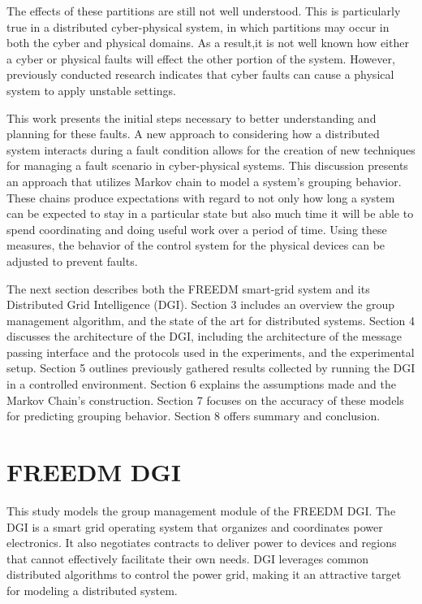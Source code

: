 The effects of these partitions are still not well understood.
This is particularly true in a distributed cyber-physical system, in which partitions may occur in both the cyber and physical domains.
As a result,it is not well known how either a cyber or physical faults will effect the other portion of the system.
However, previously conducted research \cite{HARINI}\cite{TSG} indicates that cyber faults can cause a
physical system to apply unstable settings.

This work presents the initial steps necessary to better understanding and planning for these faults.
A new approach to considering how a distributed system interacts during a fault condition allows for the creation of new techniques for managing a fault scenario in cyber-physical systems. 
This discussion presents an approach that utilizes Markov chain to model a system's grouping behavior.
These chains produce expectations with regard to not only how long a system can be expected to stay in a particular state but also much time it will be able to spend coordinating and doing useful work over a period
of time. 
Using these measures, the behavior of the control system for the physical devices can be adjusted to prevent faults.

The next section describes both the FREEDM smart-grid system and its Distributed Grid Intelligence (DGI).
Section 3 includes an overview the group management algorithm, and the state of the art for distributed systems.
Section 4 discusses the architecture of the DGI, including the architecture of the message passing interface and the protocols used in the experiments, and the experimental setup.
Section 5 outlines previously gathered results collected by running the DGI in a controlled environment.
Section 6 explains the assumptions made and the Markov Chain's construction. 
Section 7 focuses on the accuracy of these models for predicting grouping behavior.
Section 8 offers summary and conclusion.

\section{FREEDM DGI}

This study models the group management module of the FREEDM DGI.
The DGI is a smart grid operating system that organizes and coordinates power electronics.
It also negotiates contracts to deliver power to devices and regions that cannot effectively facilitate their own needs.
DGI leverages common distributed algorithms to control the power grid, making it an attractive target for modeling a distributed system.

